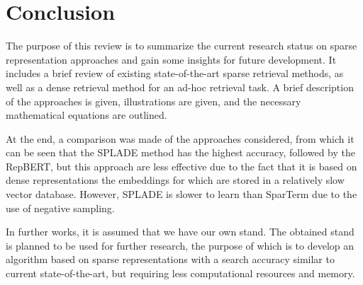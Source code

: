 \documentclass[
    twocolumn,
]{ceurart}
\begin{document}
    \section{Conclusion}

    The purpose of this review is to summarize the current research status on sparse representation
    approaches and gain some insights for future development.
    It includes a brief review of existing state-of-the-art sparse retrieval methods, as well as a
    dense retrieval method for an ad-hoc retrieval task.
    A brief description of the approaches is given, illustrations are given, and the necessary
    mathematical equations are outlined.

    At the end, a comparison was made of the approaches considered, from which it can be seen that
    the SPLADE method has the highest accuracy, followed by the RepBERT, but this
    approach are less effective due to the fact that it is based on dense representations the
    embeddings for which are stored in a relatively slow vector database.
    However, SPLADE is slower to learn than SparTerm due to the use of negative sampling.

    In further works, it is assumed that we have our own stand.
    The obtained stand is planned to be used for further research, the purpose of which is to
    develop an algorithm based on sparse representations with a search accuracy similar to
    current state-of-the-art, but requiring less computational resources and memory.

    

    \appendix
\end{document}
